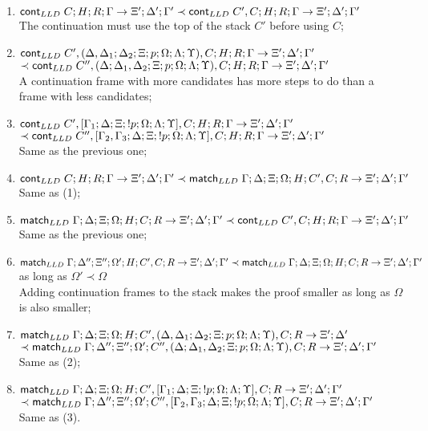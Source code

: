 \begin{enumerate}
   \item $\mathsf{cont}_{LLD} \; C; H; R; \Gamma \rightarrow \Xi'; \Delta'; \Gamma' \prec \mathsf{cont}_{LLD} \; C', C; H; R; \Gamma \rightarrow \Xi'; \Delta'; \Gamma'$\\
   The continuation must use the top of the stack $C'$ before using $C$;
   \item $\mathsf{cont}_{LLD} \; C', (\Delta, \Delta_1; \Delta_2; \Xi; p; \Omega; \Lambda; \Upsilon), C; H; R; \Gamma \rightarrow \Xi'; \Delta'; \Gamma'$\\
   \hspace*{1cm}$\prec \mathsf{cont}_{LLD} \; C'', (\Delta; \Delta_1, \Delta_2; \Xi; p; \Omega; \Lambda; \Upsilon), C; H; R; \Gamma \rightarrow \Xi'; \Delta'; \Gamma'$\\
   A continuation frame with more candidates has more steps to do than a frame with less candidates;
   \item $\mathsf{cont}_{LLD} \; C', [\Gamma_1; \Delta; \Xi; {!} p; \Omega; \Lambda; \Upsilon], C; H; R; \Gamma \rightarrow \Xi'; \Delta'; \Gamma'$\\
   \hspace*{1cm} $\prec \mathsf{cont}_{LLD} \; C'', [\Gamma_2, \Gamma_3; \Delta; \Xi; {!} p; \Omega; \Lambda; \Upsilon], C; H; R; \Gamma \rightarrow \Xi'; \Delta'; \Gamma'$\\
      Same as the previous one;
   \item $\mathsf{cont}_{LLD} \; C; H; R; \Gamma \rightarrow \Xi'; \Delta'; \Gamma' \prec \mathsf{match}_{LLD} \; \Gamma; \Delta; \Xi; \Omega; H; C', C; R \rightarrow \Xi'; \Delta'; \Gamma'$\\
   Same as (1);
   \item $\mathsf{match}_{LLD} \; \Gamma; \Delta; \Xi; \Omega; H; C; R \rightarrow \Xi'; \Delta'; \Gamma' \prec \mathsf{cont}_{LLD} \; C', C; H; R; \Gamma \rightarrow \Xi'; \Delta'; \Gamma'$\\
   Same as the previous one;
   \item $\mathsf{match}_{LLD} \; \Gamma; \Delta''; \Xi''; \Omega'; H; C', C; R \rightarrow \Xi'; \Delta'; \Gamma' \prec \mathsf{match}_{LLD} \; \Gamma; \Delta; \Xi; \Omega; H; C; R \rightarrow \Xi'; \Delta'; \Gamma'$ as long as $\Omega' \prec \Omega$\\
   Adding continuation frames to the stack makes the proof smaller as long as $\Omega$ is also smaller; 
   \item $\mathsf{match}_{LLD} \; \Gamma; \Delta; \Xi; \Omega; H; C', (\Delta, \Delta_1; \Delta_2; \Xi; p; \Omega; \Lambda; \Upsilon), C; R \rightarrow \Xi'; \Delta'$\\
   \hspace*{1cm} $\prec \mathsf{match}_{LLD} \; \Gamma; \Delta''; \Xi''; \Omega'; C'', (\Delta; \Delta_1, \Delta_2; \Xi; p; \Omega; \Lambda; \Upsilon), C; R \rightarrow \Xi'; \Delta'; \Gamma'$\\
   Same as (2);
   \item $\mathsf{match}_{LLD} \; \Gamma; \Delta; \Xi; \Omega; H; C', [\Gamma_1; \Delta; \Xi; {!} p; \Omega; \Lambda; \Upsilon], C; R \rightarrow \Xi'; \Delta'; \Gamma'$\\
   \hspace*{1cm} $\prec \mathsf{match}_{LLD} \; \Gamma; \Delta''; \Xi''; \Omega'; C'', [\Gamma_2, \Gamma_3; \Delta; \Xi; {!} p; \Omega; \Lambda; \Upsilon], C; R \rightarrow \Xi'; \Delta'; \Gamma'$\\
   Same as (3).
\end{enumerate}